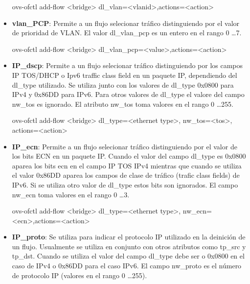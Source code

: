 \begin{itemize}
\begin{center}
ovs-ofctl add-flow <bridge> dl\_vlan=<vlanid>,actions=<action>
\end{center}

\item \textbf{vlan\_PCP}: Permite a un flujo selecionar tr\'afico distinguiendo por el valor de prioridad de VLAN. El valor dl\_vlan\_pcp es un entero en el rango 0 \dots 7.

\begin{center}
ovs-ofctl add-flow <bridge> dl\_vlan\_pcp=<value>,actions=<action>
\end{center}

\item \textbf{IP\_dscp}: Permite a un flujo selecionar tr\'afico distinguiendo por los campos IP TOS/DHCP o Ipv6 traffic class field en un paquete IP, dependiendo del dl\_type utilizado. Se utiliza junto con los valores de dl\_type 0x0800 para IPv4 y 0x86DD para IPv6. Para otros valores de dl\_type el valore del campo nw\_tos es ignorado. El atributo nw\_tos toma valores en el rango 0 \dots 255.

\begin{center}
ovs-ofctl add-flow <bridge> dl\_type=<ethernet type>, nw\_tos=<tos>, actions=<action>
\end{center}

\item \textbf{IP\_ecn}: Permite a un flujo selecionar tr\'afico distinguiendo por el valor de los bits ECN en un paquete IP. Cuando el valor del campo dl\_type es 0x0800 aparea los bits ecn en el campo IP TOS IPv4 mientras que cuando se utiliza el valor 0x86DD aparea los campos de clase de tr\'afico (trafic class fields) de IPv6. Si se utiliza otro valor de dl\_type estos bits son ignorados. El campo nw\_ecn toma valores en el rango 0 \dots 3.

\begin{center}
ovs-ofctl add-flow <bridge> dl\_type=<ethernet type>, nw\_ecn=<ecn>,actions=<action>
\end{center}

\item \textbf{IP\_proto}: Se utiliza para indicar el protocolo IP utilizado en la deinici\'on de un flujo. Usualmente se utiliza en conjunto con otros atributos como tp\_src y tp\_dst. Cuando se utiliza el valor del campo dl\_type debe ser o 0x0800 en el caso de IPv4 o 0x86DD para el caso IPv6. El campo nw\_proto es el n\'umero de protocolo IP (valores en el rango 0 \dots 255).


\end{itemize}
